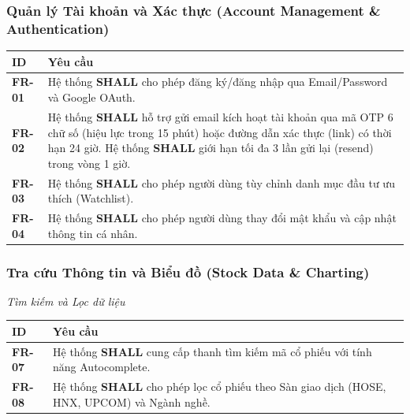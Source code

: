 \documentclass[12pt, a4paper]{article}
\begin{document}
\subsubsection{Quản lý Tài khoản và Xác thực (Account Management \& Authentication)}
\begin{table}[htbp]
    \centering
    \renewcommand{\arraystretch}{1.3}
    \begin{tabularx}{\textwidth}{|l|X|}
        \hline
        \rowcolor{gray!10}
        \textbf{ID}    & \textbf{Yêu cầu}                                                                             \\
        \hline
        \textbf{FR-01} & Hệ thống \textbf{SHALL} cho phép đăng ký/đăng nhập qua Email/Password và Google OAuth.       \\
        \hline
        \textbf{FR-02} & Hệ thống \textbf{SHALL} hỗ trợ gửi email kích hoạt tài khoản qua mã OTP 6 chữ số (hiệu lực trong 15 phút) hoặc đường dẫn xác thực (link) có thời hạn 24 giờ. Hệ thống \textbf{SHALL} giới hạn tối đa 3 lần gửi lại (resend) trong vòng 1 giờ. \\
        \hline
        \textbf{FR-03} & Hệ thống \textbf{SHALL} cho phép người dùng tùy chỉnh danh mục đầu tư ưu thích (Watchlist).  \\
        \hline
        \textbf{FR-04} & Hệ thống \textbf{SHALL} cho phép người dùng thay đổi mật khẩu và cập nhật thông tin cá nhân. \\
        \hline
    \end{tabularx}
\end{table}

\subsubsection{Tra cứu Thông tin và Biểu đồ (Stock Data \& Charting)}

\noindent\textit{Tìm kiếm và Lọc dữ liệu}
\begin{table}[htbp]
    \centering
    \renewcommand{\arraystretch}{1.3}
    \begin{tabularx}{\textwidth}{|l|X|}
        \hline
        \rowcolor{gray!10}
        \textbf{ID}    & \textbf{Yêu cầu}                                                                                   \\
        \hline
        \textbf{FR-07} & Hệ thống \textbf{SHALL} cung cấp thanh tìm kiếm mã cổ phiếu với tính năng Autocomplete.            \\
        \hline
        \textbf{FR-08} & Hệ thống \textbf{SHALL} cho phép lọc cổ phiếu theo Sàn giao dịch (HOSE, HNX, UPCOM) và Ngành nghề. \\
        \hline
    \end{tabularx}
\end{table}
\end{document}
